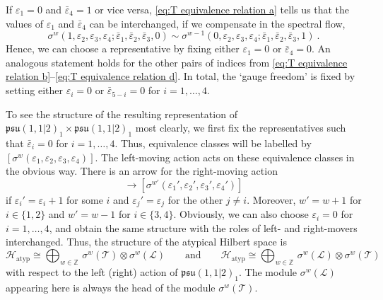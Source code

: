 \documentclass[12pt,a4paper]{article}
\newcommand{\be}{\begin{equation}}
\newcommand{\ee}{\end{equation}}
\begin{document}
If $\varepsilon_1=0$ and $\bar{\varepsilon}_4=1$ or vice versa, \eqref{eq:T equivalence relation a} tells us that the values of $\varepsilon_1$ and $\bar{\varepsilon}_4$ can be interchanged, if we compensate in the spectral flow,
\be 
\sigma^w(1,\varepsilon_2,\varepsilon_3,\varepsilon_4;\bar{\varepsilon}_1,\bar{\varepsilon}_2,\bar{\varepsilon}_3,0) \sim \sigma^{w-1}(0,\varepsilon_2,\varepsilon_3,\varepsilon_4;\bar{\varepsilon}_1,\bar{\varepsilon}_2,\bar{\varepsilon}_3,1)\ .
\ee
Hence, we can choose a representative by fixing either $\varepsilon_1=0$ or $\bar{\varepsilon}_4=0$.
An analogous statement holds for the other pairs of indices from \eqref{eq:T equivalence relation b}--\eqref{eq:T equivalence relation d}. In total, the `gauge freedom' is fixed by setting either $\varepsilon_i=0$ or $\bar{\varepsilon}_{5-i}=0$ for $i=1,\dots,4$.

To see the structure of the resulting representation of $\mathfrak{psu}(1,1|2)_1 \times \mathfrak{psu}(1,1|2)_1$ most clearly, we first fix the representatives such that $\bar{\varepsilon}_i=0$ for $i=1,\dots,4$. Thus, equivalence classes will be labelled by $[\sigma^w(\varepsilon_1,\varepsilon_2,\varepsilon_3,\varepsilon_4)]$. The left-moving action acts on these equivalence classes in the obvious way. 
There is an arrow for the right-moving action
\be 
[\sigma^w(\varepsilon_1,\varepsilon_2,\varepsilon_3,\varepsilon_4)] \longrightarrow [\sigma^{w'}(\varepsilon_1',\varepsilon_2',\varepsilon_3',\varepsilon_4')]
\ee
if $\varepsilon_i'=\varepsilon_i+1$ for some $i$ and $\varepsilon_j'=\varepsilon_j$ for the other $j \ne i$. Moreover, $w'=w+1$ for $i\in \{1,2\}$ and $w'=w-1$ for $i\in \{3,4\}$. Obviously, we can also choose ${\varepsilon}_i=0$ for $i=1,\dots,4$, and obtain the same structure with the roles of left- and right-movers interchanged. Thus, the structure of the atypical Hilbert space is 
\be 
\mathcal{H}_\text{atyp}\cong\bigoplus_{w \in \mathds{Z}}\, \sigma^w(\mathscr{T})\otimes \sigma^w(\mathscr{L})\qquad\text{and}\qquad \mathcal{H}_\text{atyp}\cong\bigoplus_{w \in \mathds{Z}}\, \sigma^w(\mathscr{L})\otimes \sigma^w(\mathscr{T})
\ee
with respect to the left (right) action of $\mathfrak{psu}(1,1|2)_1$. The module $\sigma^w(\mathscr{L})$ appearing here is always the head of the module $\sigma^w(\mathscr{T})$.
\end{document}

